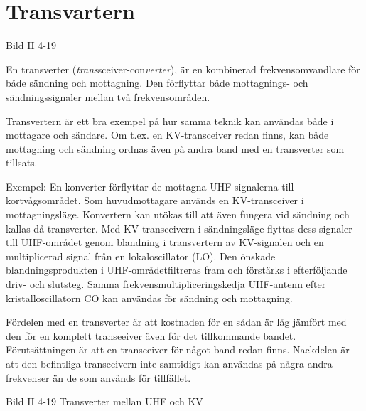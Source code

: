 \section{Transvartern}

Bild II 4-19

En transverter (\emph{trans}sceiver-con\emph{verter}), är en
kombinerad frekvensomvandlare för både sändning och mottagning. Den
förflyttar både mottagnings- och sändningssignaler mellan två
frekvensområden.

Transvertern är ett bra exempel på hur samma teknik kan användas både
i mottagare och sändare. Om t.ex. en KV-transceiver redan finns, kan
både mottagning och sändning ordnas även på andra band med en
transverter som tillsats.

Exempel: En konverter förflyttar de mottagna UHF-signalerna till
kortvågsområdet. Som huvudmottagare används en KV-transceiver i
mottagningsläge. Konvertern kan utökas till att även fungera vid
sändning och kallas då transverter. Med KV-transceivern i
sändningsläge flyttas dess signaler till UHF-området genom blandning
i transvertern av KV-signalen och en multiplicerad signal från en
lokaloscillator (LO). Den önskade blandningsprodukten i
UHF-områdetfiltreras fram och förstärks i efterföljande driv- och
slutsteg. Samma frekvensmultipliceringskedja UHF-antenn efter
kristalloscillatorn CO kan användas för sändning och mottagning.

Fördelen med en transverter är att kostnaden för en sådan är låg
jämfört med den för en komplett transeeiver även för det tillkommande
bandet. Förutsättningen är att en transceiver för något band redan
finns.  Nackdelen är att den befintliga transeeivern inte samtidigt
kan användas på några andra frekvenser än de som används för
tillfället.

Bild II 4-19 Transverter mellan UHF och KV
